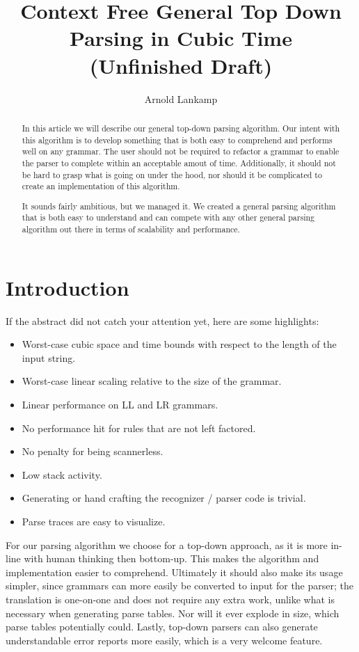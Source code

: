 \documentclass[a4paper,10pt]{article}
\title{Context Free General Top Down Parsing in Cubic Time\\(Unfinished Draft)}
\author{Arnold Lankamp}
\begin{document}
\maketitle

\begin{abstract}

In this article we will describe our general top-down parsing algorithm. Our intent with this algorithm is to develop something that is both easy to comprehend and performs well on any grammar. The user should not be required to refactor a grammar to enable the parser to complete within an acceptable amout of time. Additionally, it should not be hard to grasp what is going on under the hood, nor should it be complicated to create an implementation of this algorithm.

It sounds fairly ambitious, but we managed it. We created a general parsing algorithm that is both easy to understand and can compete with any other general parsing algorithm out there in terms of scalability and performance.

\end{abstract}

\section{Introduction}

If the abstract did not catch your attention yet, here are some highlights:
\begin{itemize}
 \setlength{\itemsep}{0pt}
 \setlength{\parskip}{0pt}
 \setlength{\parsep}{0pt}
 
 \item Worst-case cubic space and time bounds with respect to the length of the input string.
 \item Worst-case linear scaling relative to the size of the grammar.
 \item Linear performance on LL and LR grammars.
 \item No performance hit for rules that are not left factored.
 \item No penalty for being scannerless.
 \item Low stack activity.
 \item Generating or hand crafting the recognizer / parser code is trivial.
 \item Parse traces are easy to visualize.
\end{itemize}

For our parsing algorithm we choose for a top-down approach, as it is more in-line with human thinking then bottom-up. This makes the algorithm and implementation easier to comprehend. Ultimately it should also make its usage simpler, since grammars can more easily be converted to input for the parser; the translation is one-on-one and does not require any extra work, unlike what is necessary when generating parse tables. Nor will it ever explode in size, which parse tables potentially could. Lastly, top-down parsers can also generate understandable error reports more easily, which is a very welcome feature.
\end{document}
